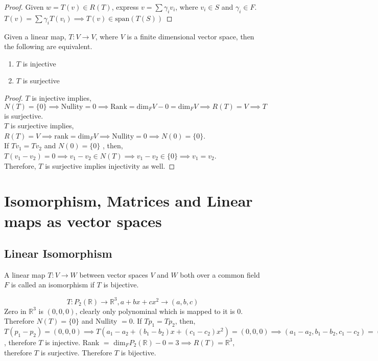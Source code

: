 \documentclass[11pt,a4paper]{colorart}
\def\l{\left}
\def\r{\right}
\def\R{\mathbb{R}}
\def\g{\gamma}
\begin{document}
\begin{proof}
	Given $w=T\l(v\r)\in R\l(T\r)$, express $v=\sum \g_iv_i$, where $v_i\in S$ and $\g_i\in F$. $T\l(v\r)=\sum \g_iT\l(v_i\r) \implies T\l(v\r)\in\text{span}\l(T\l(S\r)\r)$
\end{proof}

\begin{corollary}
	Given a linear map, $T:V\rightarrow V$, where $V$ is a finite dimensional vector space, then the following are equivalent.
	\begin{enumerate}
		\item $T$ is injective
		\item $T$ is surjective
	\end{enumerate}
\end{corollary}

\begin{proof}
	$T$ is injective implies, $N\l(T\r)=\{0\}\implies \text{Nullity}=0\implies \text{Rank} = \text{dim}_FV-0=\text{dim}_FV\implies R\l(T\r)=V\implies T$ is surjective.\\
	$T$ is surjective implies, $R\l(T\r)=V\implies \text{rank}= \text{dim}_FV\implies \text{Nullity}=0\implies N\l(0\r) =\{0\}$.\\
	If $Tv_1=Tv_2$ and $N\l(0\r) =\{0\}$ , then, $T\l(v_1-v_2\r)=0\implies v_1-v_2\in N\l(T\r)\implies v_1-v_2 \in \{0\} \implies v_1=v_2$.\\
	Therefore, $T$ is surjective implies injectivity as well.
\end{proof}

\section{Isomorphism, Matrices and Linear maps as vector spaces}

\subsection{Linear Isomorphism}

\begin{definition}
	A linear map $T:V\rightarrow W$ between vector spaces $V$ and $W$ both over a common field $F$ is called an isomorphism if $T$ is bijective.
\end{definition}

\begin{example}
	\[T:P_2\l(\R\r)\rightarrow \R^3, a+bx+cx^2\rightarrow\l(a,b,c\r)\]
	Zero in $\R^3$ is $\l(0,0,0\r)$, clearly only polynominal which is mapped to it is 0. Therefore $N\l(T\r) = \{0\}$ and Nullity $=0$. If $Tp_1=Tp_2$, then, $T\l(p_1-p_2\r)=\l(0,0,0\r) \implies T\l(a_1-a_2+\l(b_1-b_2\r)x+\l(c_1-c_2\r)x^2\r)=\l(0,0,0\r) \implies\l(a_1-a_2,b_1-b_2,c_1-c_2\r)=\l(0,0,0\r)\implies a_1=a_2,b_1=b_2,c_1=c_2\implies p_1=p_2$, therefore $T$ is injective. Rank $=$ dim$_FP_2\l(\R\r) - 0 = 3 \implies R\l(T\r)=\R^3$, therefore $T$ is surjective. Therefore $T$ is bijective.
\end{example}
\end{document}
